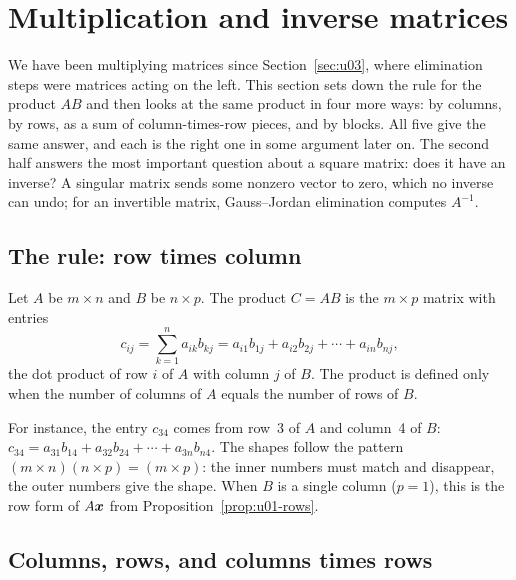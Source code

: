 \section{Multiplication and inverse matrices}\label{sec:u04}

We have been multiplying matrices since Section~\ref{sec:u03}, where elimination steps were
matrices acting on the left. This section sets down the rule for the product $AB$ and then
looks at the same product in four more ways: by columns, by rows, as a sum of
column-times-row pieces, and by blocks. All five give the same answer, and each is the right
one in some argument later on. The second half answers the most important question about a
square matrix: does it have an inverse? A singular matrix sends some nonzero vector to zero,
which no inverse can undo; for an invertible matrix, Gauss--Jordan elimination computes
$A^{-1}$.

\subsection{The rule: row times column}

\begin{definition}\label{def:u04-product}
Let $A$ be $m\times n$ and $B$ be $n\times p$. The product $C=AB$ is the $m\times p$ matrix
with entries
\[
  c_{ij}=\sum_{k=1}^{n}a_{ik}b_{kj}=a_{i1}b_{1j}+a_{i2}b_{2j}+\cdots+a_{in}b_{nj},
\]
the dot product of row $i$ of $A$ with column $j$ of $B$. The product is defined only when
the number of columns of $A$ equals the number of rows of $B$.
\end{definition}

For instance, the entry $c_{34}$ comes from row~3 of $A$ and column~4 of $B$:
$c_{34}=a_{31}b_{14}+a_{32}b_{24}+\cdots+a_{3n}b_{n4}$. The shapes follow the pattern
$(m\times n)(n\times p)=(m\times p)$: the inner numbers must match and disappear, the outer
numbers give the shape. When $B$ is a single column ($p=1$), this is the row form of
$A\boldsymbol{x}$ from Proposition~\ref{prop:u01-rows}.

\subsection{Columns, rows, and columns times rows}

